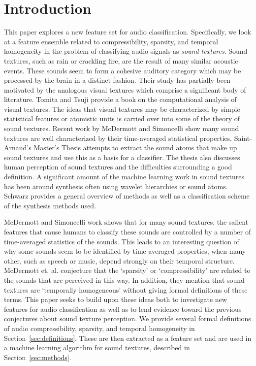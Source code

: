 \documentclass{sig-alternate-05-2015}
\begin{document}
\section{Introduction} 
This paper explores a new feature set for audio classification. Specifically, we look at a feature ensemble related to compressibility, sparsity, and temporal homogeneity in the problem of classifying audio signals as \emph{sound textures}. Sound textures, such as rain or crackling fire, are the result of many similar acoustic events. These sounds seem to form a cohesive auditory category which may be processed by the brain in a distinct fashion\cite{McDermott2011926, mcdermott2013summary}. Their study has partially been motivated by the analogous visual textures which comprise a significant body of literature. Tomita and Tsuji provide a book on the computational analysis of visual textures\cite{tomita2013computer}. The ideas that visual textures may be characterized by simple statistical features\cite{julesz1962visual} or atomistic units\cite{julesz1981textons} is carried over into some of the theory of sound textures. Recent work by McDermott and Simoncelli show many sound textures are well characterized by their time-averaged statistical properties\cite{McDermott2011926, mcdermott2013summary}. Saint-Arnaud's Master's Thesis attempts to extract the sound atoms that make up sound textures and use this as a basis for a classifier\cite{saint1995classification}. The thesis also discusses human perception of sound textures and the difficulties surrounding a good definition. A significant amount of the machine learning work in sound textures has been around synthesis often using wavelet hierarchies\cite{kersten2010sound} or sound atoms\cite{saint1995analysis}. Schwarz provides a general overview of methods as well as a classification scheme of the synthesis methods used\cite{schwarz2011state}.

McDermott and Simoncelli work shows that for many sound textures, the salient features that cause humans to classify these sounds are controlled by a number of time-averaged statistics of the sounds\cite{McDermott2011926, mcdermott2013summary}. This leads to an interesting question of why some sounds seem to be identified by time-averaged properties, when many other, such as speech or music, depend strongly on their temporal structure. McDermott et. al. conjecture that the `sparsity' or `compressibility' are related to the sounds that are perceived in this way. In addition, they mention that sound textures are `temporally homogeneous' without giving formal definitions of these terms. This paper seeks to build upon these ideas both to investigate new features for audio classification as well as to lend evidence toward the previous conjectures about sound texture perception. We provide several formal definitions of audio compressibility, sparsity, and temporal homogeneity in Section~\ref{sec:definitions}. These are then extracted as a feature set and are used in a machine learning algorithm for sound textures, described in Section~\ref{sec:methods}.
\end{document}
